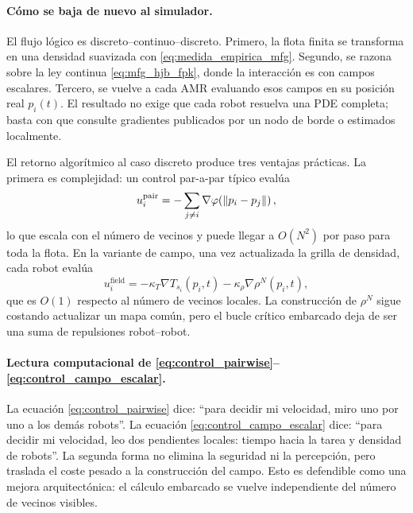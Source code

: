 

\paragraph{Cómo se baja de nuevo al simulador.}
El flujo lógico es discreto--continuo--discreto. Primero, la flota finita se transforma
en una densidad suavizada con \eqref{eq:medida_empirica_mfg}. Segundo, se razona sobre la
ley continua \eqref{eq:mfg_hjb_fpk}, donde la interacción es con campos escalares.
Tercero, se vuelve a cada AMR evaluando esos campos en su posición real $p_i(t)$. El
resultado no exige que cada robot resuelva una PDE completa; basta con que consulte
gradientes publicados por un nodo de borde o estimados localmente.

El retorno algorítmico al caso discreto produce tres ventajas prácticas. La primera es
complejidad: un control par-a-par típico evalúa
\begin{equation}
  u_i^{\mathrm{pair}}=
  -\sum_{j\ne i}\nabla\varphi\!\left(\left\|p_i-p_j\right\|\right),
  \label{eq:control_pairwise}
\end{equation}
lo que escala con el número de vecinos y puede llegar a $O(N^2)$ por paso para toda la
flota. En la variante de campo, una vez actualizada la grilla de densidad, cada robot
evalúa
\begin{equation}
  u_i^{\mathrm{field}}=
  -\kappa_T\nabla T_{s_i}(p_i,t)
  -\kappa_\rho\nabla\rho^N(p_i,t),
  \label{eq:control_campo_escalar}
\end{equation}
que es $O(1)$ respecto al número de vecinos locales. La construcción de
$\rho^N$ sigue costando actualizar un mapa común, pero el bucle crítico embarcado deja de
ser una suma de repulsiones robot--robot.

\paragraph{Lectura computacional de \eqref{eq:control_pairwise}--\eqref{eq:control_campo_escalar}.}
La ecuación \eqref{eq:control_pairwise} dice: ``para decidir mi velocidad, miro uno por
uno a los demás robots''. La ecuación \eqref{eq:control_campo_escalar} dice: ``para
decidir mi velocidad, leo dos pendientes locales: tiempo hacia la tarea y densidad de
robots''. La segunda forma no elimina la seguridad ni la percepción, pero traslada el
coste pesado a la construcción del campo. Esto es defendible como una mejora
arquitectónica: el cálculo embarcado se vuelve independiente del número de vecinos
visibles.

